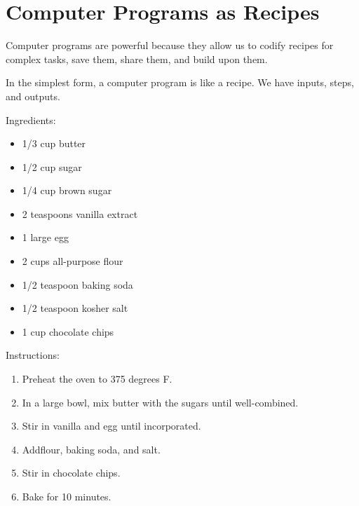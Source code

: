\documentclass[]{book}
\providecommand{\tightlist}{%
  \setlength{\itemsep}{0pt}\setlength{\parskip}{0pt}}
\theoremstyle{definition}
\theoremstyle{definition}
\theoremstyle{definition}
\theoremstyle{remark}
\begin{document}
\hypertarget{computer-programs-as-recipes}{%
\section{Computer Programs as
Recipes}\label{computer-programs-as-recipes}}

Computer programs are powerful because they allow us to codify recipes
for complex tasks, save them, share them, and build upon them.

In the simplest form, a computer program is like a recipe. We have
inputs, steps, and outputs.

Ingredients:

\begin{itemize}
\tightlist
\item
  1/3 cup butter\\
\item
  1/2 cup sugar\\
\item
  1/4 cup brown sugar\\
\item
  2 teaspoons vanilla extract\\
\item
  1 large egg\\
\item
  2 cups all-purpose flour\\
\item
  1/2 teaspoon baking soda\\
\item
  1/2 teaspoon kosher salt\\
\item
  1 cup chocolate chips
\end{itemize}

Instructions:

\begin{enumerate}
\def\labelenumi{\arabic{enumi}.}
\tightlist
\item
  Preheat the oven to 375 degrees F.
\item
  In a large bowl, mix butter with the sugars until well-combined.
\item
  Stir in vanilla and egg until incorporated.
\item
  Addflour, baking soda, and salt.\\
\item
  Stir in chocolate chips.
\item
  Bake for 10 minutes.
\end{enumerate}
\end{document}
